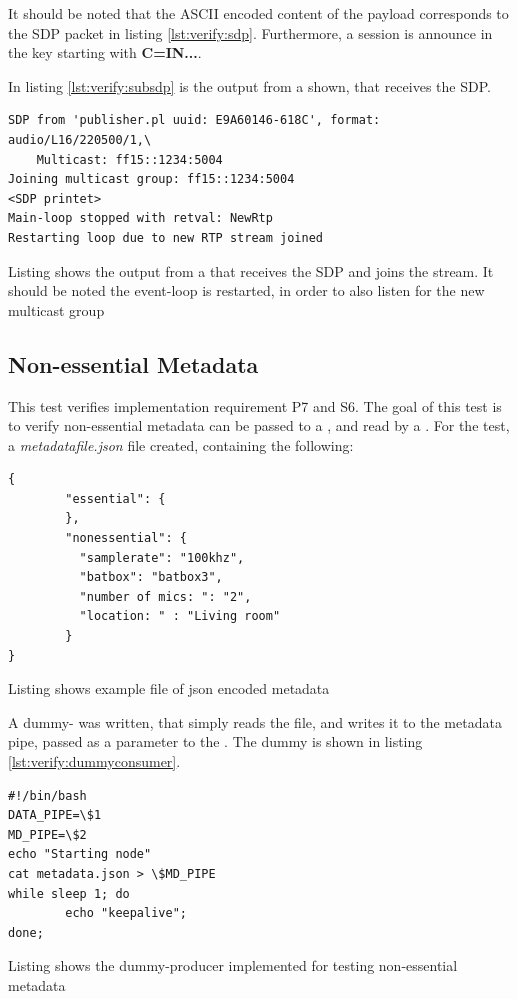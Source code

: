 It should be noted that the ASCII encoded content of the payload corresponds to the SDP packet in listing \ref{lst:verify:sdp}. Furthermore, a session is announce in the key starting with \textbf{C=IN...}.

In listing \ref{lst:verify:subsdp} is the output from a \sub{} shown, that receives the SDP.


\begin{listing}[H] 
\begin{verbatim}
SDP from 'publisher.pl uuid: E9A60146-618C', format: audio/L16/220500/1,\
	Multicast: ff15::1234:5004
Joining multicast group: ff15::1234:5004
<SDP printet>
Main-loop stopped with retval: NewRtp
Restarting loop due to new RTP stream joined
\end{verbatim}
\caption{Listing shows the output from a \sub{} that receives the SDP and joins the stream. It should be noted the event-loop is restarted, in order to also listen for the new multicast group}
\label{lst:verify:subsdp}
\end{listing}

\subsection{Non-essential Metadata} \label{sec:verify:nonessentialmetadata}
This test verifies implementation requirement P7 and S6. The goal of this test is to verify non-essential metadata can be passed to a \pro{}, and read by a \con{}. 
For the test, a \textit{metadatafile.json} file created, containing the following:

\begin{listing}[H] 
\begin{verbatim}
{
        "essential": {
        },
        "nonessential": {
          "samplerate": "100khz",
          "batbox": "batbox3",
          "number of mics: ": "2",
          "location: " : "Living room"
        }
}
\end{verbatim}
\caption{Listing shows example file of json encoded metadata}
\label{lst:verify:nonessentialmd}
\end{listing}

A dummy-\pro{} was written, that simply reads the file, and writes it to the metadata pipe, passed as a parameter to the \pro{}. The dummy \pro{} is shown in listing \ref{lst:verify:dummyconsumer}.

\begin{listing}[H] 
\begin{verbatim}
#!/bin/bash
DATA_PIPE=\$1
MD_PIPE=\$2
echo "Starting node"
cat metadata.json > \$MD_PIPE
while sleep 1; do
        echo "keepalive";
done;  
\end{verbatim}
\caption{Listing shows the dummy-producer implemented for testing non-essential metadata}
\label{lst:verify:dummyconsumer}
\end{listing}

